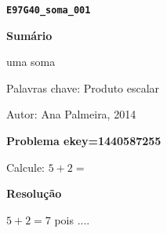 \documentclass{article}
\begin{document}
{\centering\bf \verb"E97G40_soma_001" }

\noindent\textbf{Sumário}



uma soma

Palavras chave: Produto escalar

Autor: Ana Palmeira, 2014




\noindent\textbf{Problema ekey=1440587255 }




Calcule: $5 + 2 = $    

 

\noindent\textbf{Resolução}



$5 + 2 = 7$   pois ....
\end{document}
